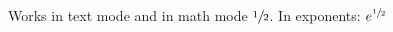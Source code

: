 \documentclass{report}
\begin{document}
Works in text mode  and in math mode $\sfrac{1}{2}$.
In exponents: $e^{\sfrac{1}{2}}$
\end{document}
